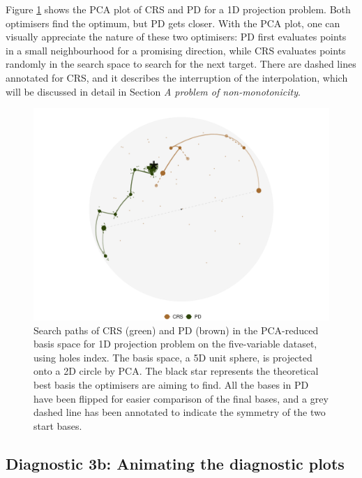 Figure \ref{fig:toy-pca} shows the PCA plot of CRS and PD for a 1D
projection problem. Both optimisers find the optimum, but PD gets
closer. With the PCA plot, one can visually appreciate the nature of
these two optimisers: PD first evaluates points in a small neighbourhood
for a promising direction, while CRS evaluates points randomly in the
search space to search for the next target. There are dashed lines
annotated for CRS, and it describes the interruption of the
interpolation, which will be discussed in detail in Section \emph{A
problem of non-monotonicity}.

\begin{Schunk}
\begin{figure}

{\centering \includegraphics[width=0.7\linewidth]{figs/toy-pca} 

}

\caption[Search paths of CRS (green) and PD (brown) in the PCA-reduced basis space for 1D projection problem on the five-variable dataset,  using holes index]{Search paths of CRS (green) and PD (brown) in the PCA-reduced basis space for 1D projection problem on the five-variable dataset,  using holes index. The basis space, a 5D unit sphere, is projected onto a 2D circle by PCA. The black star represents the theoretical best basis the optimisers are aiming to find. All the bases in PD have been flipped for easier comparison of the final bases, and a grey dashed line has been annotated to indicate the symmetry of the two start bases.}\label{fig:toy-pca}
\end{figure}
\end{Schunk}

\hypertarget{diagnostic-3b-animating-the-diagnostic-plots}{%
\subsection{Diagnostic 3b: Animating the diagnostic
plots}\label{diagnostic-3b-animating-the-diagnostic-plots}}

